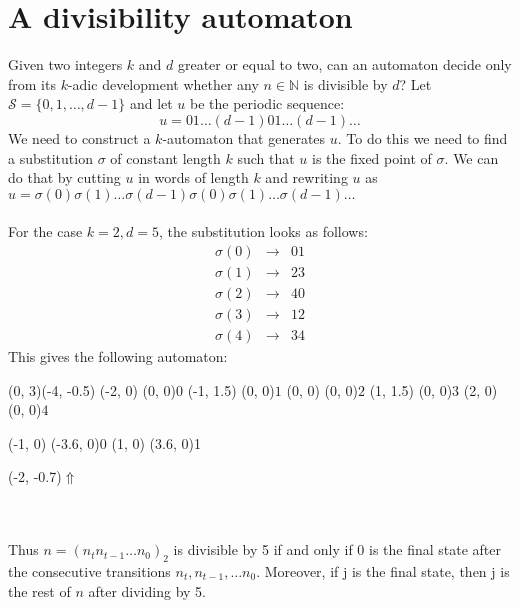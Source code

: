 \documentclass{article}
\begin{document}
\section*{A divisibility automaton}
Given two integers $k$ and $d$ greater or equal to two, can an automaton 
decide only from its $k$-adic development whether any $n \in \mathbb{N}$ is
divisible by $d$? Let $\mathcal{S} = \{0, 1, \ldots, d - 1\}$ and let $u$ be the
periodic sequence:
\begin{displaymath}
  u = 01\ldots(d - 1)01\ldots(d - 1)\ldots
\end{displaymath}
We need to construct a $k$-automaton that generates $u$. To do this we need to
find a substitution $\sigma$ of constant length $k$ such that $u$ is the fixed
point of $\sigma$. We can do that by cutting $u$ in words of length $k$ and
rewriting $u$ as
$u = \sigma(0)\sigma(1)\ldots\sigma(d - 1)\sigma(0)\sigma(1)\ldots\sigma(d - 1)\ldots$\\
\\
For the case $k = 2, d = 5$, the substitution looks as follows:\\
\vbox{\begin{eqnarray*}
  \sigma(0) &\rightarrow& 01\\
  \sigma(1) &\rightarrow& 23\\
  \sigma(2) &\rightarrow& 40\\
  \sigma(3) &\rightarrow& 12\\
  \sigma(4) &\rightarrow& 34
\end{eqnarray*}}
This gives the following automaton:\\
\begin{graph}(0, 3)(-4, -0.5)
  (-2, 0) (0, 0){$0$}
  (-1, 1.5) (0, 0){$1$}
  (0, 0) (0, 0){$2$}
  (1, 1.5) (0, 0){$3$}
  (2, 0) (0, 0){$4$}

  (-1, 0) \freetext(-3.6, 0){0}
   
   
   
   
   
   
   
   
  (1, 0) \freetext(3.6, 0){1}

  \freetext(-2, -0.7){$\Uparrow$}
\end{graph}\\
\\
Thus $n = (n_t n_{t - 1} \ldots n_0)_2$ is divisible by 5 if and only if 0 is
the final state after the consecutive transitions $n_t, n_{t - 1}, \ldots n_0$.
Moreover, if j is the final state, then j is the rest of $n$ after dividing
by 5.
\end{document}
